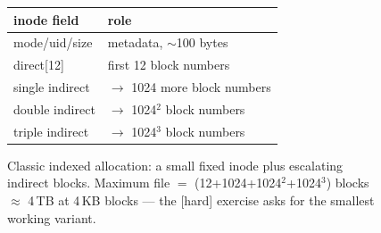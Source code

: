 \begin{figure}[htbp]
\centering
\begin{tabular}{ll}
\toprule
inode field & role \\
\midrule
mode/uid/size & metadata, $\sim$100 bytes \\
direct[12] & first 12 block numbers \\
single indirect & $\to$ 1024 more block numbers \\
double indirect & $\to$ 1024$^2$ block numbers \\
triple indirect & $\to$ 1024$^3$ block numbers \\
\bottomrule
\end{tabular}
\caption{Classic indexed allocation: a small fixed inode plus
escalating indirect blocks. Maximum file $=$
(12+1024+1024$^2$+1024$^3$) blocks $\approx$ 4\,TB at 4\,KB blocks
--- the [hard] exercise asks for the smallest working variant.}
\label{fig:inode14}
\end{figure}
